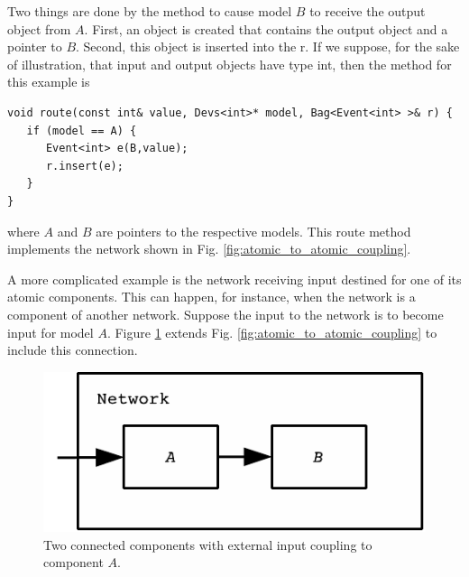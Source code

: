 Two things are done by the  method to cause  model $B$ to receive the output object from $A$. First, an  object is created that contains the output object and a pointer to $B$. Second, this  object is inserted into the  r. If we suppose, for the sake of illustration, that input and output objects have type int, then the  method for this example is
\begin{verbatim}
void route(const int& value, Devs<int>* model, Bag<Event<int> >& r) {
   if (model == A) {
      Event<int> e(B,value);
      r.insert(e);
   }
}
\end{verbatim}
where $A$ and $B$ are pointers to the respective models. This route method implements the network shown in Fig. \ref{fig:atomic_to_atomic_coupling}.

A more complicated example is the network receiving input destined for one of its atomic components. This can happen, for instance, when the network is a component of another network. Suppose the input to the network is to become input for  model $A$. Figure \ref{fig:eic_atomic_to_atomic_coupling} extends Fig. \ref{fig:atomic_to_atomic_coupling} to include this connection.
\begin{figure}[ht]
\centering
\includegraphics{network_models_figs/eic_atomic_atomic_coupling.pdf}
\caption{Two connected  components with external input coupling to component $A$.}
\label{fig:eic_atomic_to_atomic_coupling}
\end{figure}

